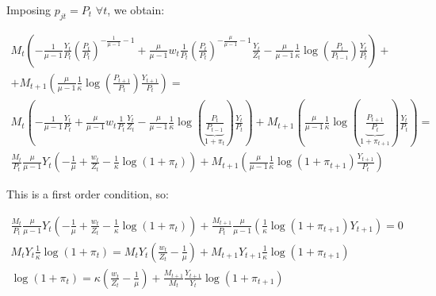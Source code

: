\documentclass[a4paper,10pt]{article}
\begin{document}
	Imposing $p_{jt} = P_t$ $\forall t$, we obtain:
	
	\begin{gather}
		M_t\left(-\frac{1}{\mu -1}\frac{Y_t}{P_t}\left(\frac{P_{t}}{P_t}\right)^{-\frac{1}{\mu-1} -1} + \frac{\mu}{\mu-1} w_t \frac{1}{P_t}\left(\frac{P_{t}}{P_t}\right)^{-\frac{\mu}{\mu-1} -1} \frac{Y_t}{Z_t} - \frac{\mu}{\mu-1}\frac{1}{\kappa}\log\left(\frac{P_{t}}{P_{t-1}}\right) \frac{Y_t}{P_{t}} \right) + \nonumber \\ 
		+ M_{t+1} \left(\frac{\mu}{\mu-1}\frac{1}{\kappa}\log\left(\frac{P_{t+1}}{P_{t}}\right) \frac{Y_{t+1}}{P_{t}}\right) = \nonumber \\
		M_t\left(-\frac{1}{\mu -1}\frac{Y_t}{P_t} + \frac{\mu}{\mu-1} w_t \frac{1}{P_t} \frac{Y_t}{Z_t} - \frac{\mu}{\mu-1}\frac{1}{\kappa}\log\left(\underbrace{\frac{P_{t}}{P_{t-1}}}_{1 + \pi_t}\right) \frac{Y_t}{P_{t}} \right) + M_{t+1} \left(\frac{\mu}{\mu-1}\frac{1}{\kappa}\log\left(\underbrace{\frac{P_{t+1}}{P_{t}}}_{1+ \pi_{t+1}}\right) \frac{Y_t}{P_{t}}\right) = \nonumber \\
		\frac{M_t}{P_t}\frac{\mu}{\mu-1}Y_t\left(-\frac{1}{\mu} +  \frac{w_t}{Z_t} - \frac{1}{\kappa}\log\left(1+\pi_t\right)\right) + M_{t+1} \left(\frac{\mu}{\mu-1}\frac{1}{\kappa}\log\left(1+\pi_{t+1}\right) \frac{Y_{t+1}}{P_{t}}\right)
	\end{gather}
	
	This is a first order condition, so:
	
	\begin{gather}
		\frac{M_t}{P_t}\frac{\mu}{\mu-1}Y_t\left(-\frac{1}{\mu} +  \frac{w_t}{Z_t} - \frac{1}{\kappa}\log\left(1+\pi_t\right)\right) + \frac{M_{t+1}}{P_t} \frac{\mu}{\mu-1}\left(\frac{1}{\kappa}\log\left(1+\pi_{t+1}\right) Y_{t+1}\right) = 0 \nonumber \\
		M_t Y_t \frac{1}{\kappa} \log(1+\pi_t) = M_t Y_t \left(\frac{w_t}{Z_t} - \frac{1}{\mu}\right) + M_{t+1} Y_{t+1} \frac{1}{\kappa} \log(1+\pi_{t+1}) \\
		\log(1+\pi_t) = \kappa\left(\frac{w_t}{Z_t} - \frac{1}{\mu}\right) + \frac{M_{t+1}}{M_t} \frac{Y_{t+1}}{Y_t} \log(1+\pi_{t+1})
	\end{gather}
	
	
	
\end{document}
